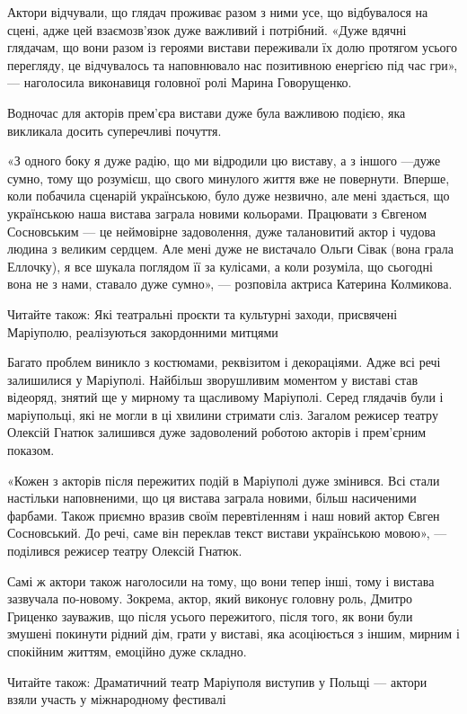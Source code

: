 Актори відчували, що глядач проживає разом з ними усе, що відбувалося на сцені,
адже цей взаємозв'язок дуже важливий і потрібний.  «Дуже вдячні глядачам, що
вони разом із героями вистави переживали їх долю протягом усього перегляду, це
відчувалось та наповнювало нас позитивною енергією під час гри», — наголосила
виконавиця головної ролі Марина Говорущенко.

Водночас для акторів прем'єра вистави дуже була важливою подією, яка викликала
досить суперечливі почуття.

«З одного боку я дуже радію, що ми відродили цю виставу, а з іншого —дуже
сумно, тому що розумієш, що свого минулого життя вже не повернути. Вперше, коли
побачила сценарій українською, було дуже незвично, але мені здається, що
українською наша вистава заграла новими кольорами. Працювати з Євгеном
Сосновським — це неймовірне задоволення, дуже талановитий актор і чудова людина
з великим сердцем. Але мені дуже не вистачало Ольги Сівак (вона грала Еллочку),
я все шукала поглядом її за кулісами, а коли розуміла, що сьогодні вона не з
нами, ставало дуже сумно», — розповіла актриса Катерина Колмикова.

Читайте також: Які театральні проєкти та культурні заходи, присвячені Маріуполю, реалізуються закордонними митцями

Багато проблем виникло з костюмами, реквізитом і декораціями. Адже всі речі
залишилися у Маріуполі. Найбільш зворушливим моментом у виставі став відеоряд,
знятий ще у мирному та щасливому Маріуполі. Серед глядачів були і маріупольці,
які не могли в ці хвилини стримати сліз. Загалом режисер театру Олексій Гнатюк
залишився дуже задоволений роботою акторів і прем'єрним показом.

«Кожен з акторів після пережитих подій в Маріуполі дуже змінився. Всі стали
настільки наповненими, що ця вистава заграла новими, більш насиченими фарбами.
Також приємно вразив своїм перевтіленням і наш новий актор Євген Сосновський.
До речі, саме він переклав текст вистави українською мовою», — поділився
режисер театру Олексій Гнатюк.

Самі ж актори також наголосили на тому, що вони тепер інші, тому і вистава
зазвучала по-новому. Зокрема, актор, який виконує головну роль, Дмитро Гриценко
зауважив, що після усього пережитого, після того, як вони були змушені покинути
рідний дім, грати у виставі, яка асоціюється з іншим, мирним і спокійним
життям, емоційно дуже складно.

Читайте також: Драматичний театр Маріуполя виступив у Польщі — актори взяли
участь у міжнародному фестивалі

